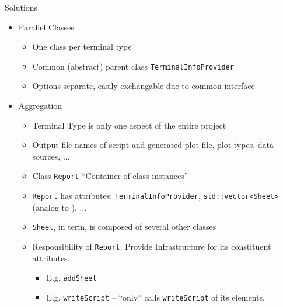 \begin{frame}{Solutions}
%
\begin{itemize}
\item Parallel Classes
	\begin{itemize}
	\item One class per terminal type
	\item Common (abstract) parent class \texttt{TerminalInfoProvider}
	\item[\Thus] Options separate, easily exchangable due to common interface
	\end{itemize}
	\pause
\item Aggregation
	\begin{itemize}
	\item Terminal Type is only one aspect of the entire project
	\item Output file names of script and generated plot file, plot types, data sources, ...
	\item[\Thus] Class \texttt{Report} \enquote{Container of class instances}
	\item[\Thus] \texttt{Report} has attributes: \texttt{TerminalInfoProvider}, \texttt{std::vector<Sheet>} (analog to ), ...
	\item[\Thus] \texttt{Sheet}, in term, is composed of several other classes
		\pause
	\item[\Thus] Responsibility of \texttt{Report}: Provide Infrastructure for its constituent attributes.
		\begin{itemize}
		\item E.\;g. \texttt{addSheet}
		\item E.\;g. \texttt{writeScript} -- \enquote{only} calls \texttt{writeScript} of its elements.
		\end{itemize}
	\end{itemize}
\end{itemize}
%
\end{frame}



